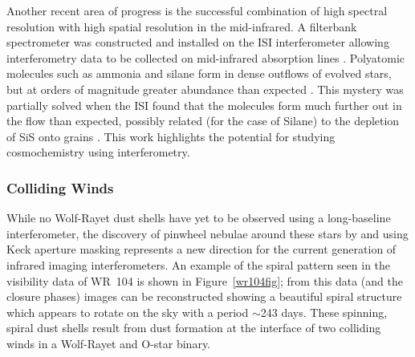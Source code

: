 \documentclass[12pt]{article}
\begin{document}
Another recent area of progress is the successful combination of high
spectral resolution with high spatial resolution in the mid-infrared.
A filterbank spectrometer was constructed and installed on the ISI
interferometer allowing interferometry data to be collected on
mid-infrared absorption lines
\citep{monnier2000a,monnier2000b,monnier2000c}.  Polyatomic molecules
such as ammonia and silane form in dense outflows of evolved stars,
but at orders of magnitude greater abundance than expected
\citep[e.g.,][]{keady1993}.  This mystery was partially solved when
the ISI found that the molecules form much further out in the flow
than expected, possibly related (for the case of Silane) to the
depletion of SiS onto grains \citep{bieging1993}.  This work
highlights the potential for studying cosmochemistry using
interferometry.

\subsubsection{Colliding Winds}
While no Wolf-Rayet dust shells have yet to be observed using a
long-baseline interferometer, the discovery of pinwheel nebulae around
these stars by \citet{tuthill1999b} and \citet{monnier1999} using Keck
aperture masking represents a new direction for the current generation
of infrared imaging interferometers.  An example of the spiral pattern
seen in the visibility data of WR~104 is shown in
Figure~\ref{wr104fig}; from this data (and the closure phases) images
can be reconstructed showing a beautiful spiral structure which
appears to rotate on the sky with a period $\sim$243 days.  These
spinning, spiral dust shells result from dust formation at the
interface of two colliding winds in a Wolf-Rayet and O-star binary.
\end{document}

